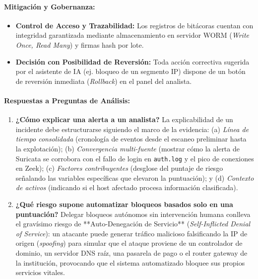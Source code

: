 \documentclass[11pt,letterpaper]{article}
\begin{document}
\paragraph{Mitigación y Gobernanza:}
\begin{itemize}
    \item \textbf{Control de Acceso y Trazabilidad:} Los registros de bitácoras cuentan con integridad garantizada mediante almacenamiento en servidor WORM (\textit{Write Once, Read Many}) y firmas hash por lote.
    \item \textbf{Decisión con Posibilidad de Reversión:} Toda acción correctiva sugerida por el asistente de IA (ej. bloqueo de un segmento IP) dispone de un botón de reversión inmediata (\textit{Rollback}) en el panel del analista.
\end{itemize}

\paragraph{Respuestas a Preguntas de Análisis:}
\begin{enumerate}
    \item \textbf{¿Cómo explicar una alerta a un analista?} La explicabilidad de un incidente debe estructurarse siguiendo el marco de la evidencia: (a) \textit{Línea de tiempo consolidada} (cronología de eventos desde el escaneo preliminar hasta la explotación); (b) \textit{Convergencia multi-fuente} (mostrar cómo la alerta de Suricata se corrobora con el fallo de login en \texttt{auth.log} y el pico de conexiones en Zeek); (c) \textit{Factores contribuyentes} (desglose del puntaje de riesgo señalando las variables específicas que elevaron la puntuación); y (d) \textit{Contexto de activos} (indicando si el host afectado procesa información clasificada).
    \item \textbf{¿Qué riesgo supone automatizar bloqueos basados solo en una puntuación?} Delegar bloqueos autónomos sin intervención humana conlleva el gravísimo riesgo de **Auto-Denegación de Servicio** (\textit{Self-Inflicted Denial of Service}): un atacante puede generar tráfico malicioso falsificando la IP de origen (\textit{spoofing}) para simular que el ataque proviene de un controlador de dominio, un servidor DNS raíz, una pasarela de pago o el router gateway de la institución, provocando que el sistema automatizado bloquee sus propios servicios vitales.
\end{enumerate}
\end{document}
